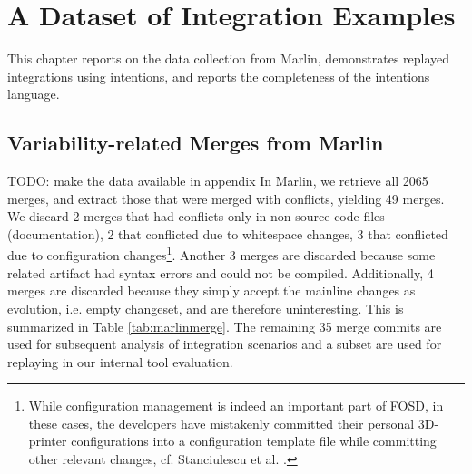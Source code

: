 \chapter{A Dataset of Integration Examples}
This chapter reports on the data collection from Marlin, demonstrates replayed integrations using intentions, and reports the completeness of the intentions language.

\section{Variability-related Merges from Marlin}\label{data-coll-res}
TODO: make the data available in appendix
In Marlin, we retrieve all 2065 merges, and extract those that were merged with conflicts, yielding 49 merges. We discard 2 merges that had conflicts only in non-source-code files (documentation), 2 that conflicted due to whitespace changes, 3 that conflicted due to configuration changes\footnote{While configuration management is indeed an important part of FOSD, in these cases, the developers have mistakenly committed their personal 3D-printer configurations into a configuration template file while committing other relevant changes, cf. Stanciulescu et al. \cite{stanciulescu2015}.}. Another 3 merges are discarded because some related artifact had syntax errors and could not be compiled. Additionally, 4 merges are discarded because they simply accept the mainline changes as evolution, i.e. empty changeset, and are therefore uninteresting. This is summarized in Table \ref{tab:marlinmerge}. The remaining 35 merge commits are used for subsequent analysis of integration scenarios and a subset are used for replaying in our internal tool evaluation.

